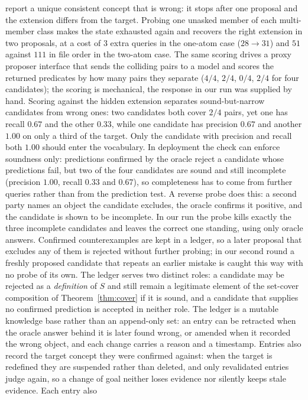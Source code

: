 \documentclass[11pt]{article}
\begin{document}
report a unique consistent concept that is wrong: it stops after one proposal and the extension
differs from the target. Probing one unasked member of each multi-member class makes the state
exhausted again and recovers the right extension in two proposals, at a cost of $3$ extra queries in
the one-atom case ($28 \to 31$) and $51$ against $111$ in file order in the two-atom case. The same scoring drives a
proxy proposer interface
that sends the colliding pairs to a model and scores the returned predicates by how many pairs they
separate ($4/4$, $2/4$, $0/4$, $2/4$ for four candidates); the scoring is mechanical, the response
in our run was supplied by hand. Scoring against the hidden extension separates sound-but-narrow
candidates from wrong ones: two candidates both cover $2/4$ pairs, yet one has recall $0.67$ and the
other $0.33$, while one candidate has precision $0.67$ and another $1.00$ on only a third of the
target. Only the candidate with precision and recall both $1.00$ should enter the vocabulary. In deployment the
check can enforce soundness only: predictions confirmed by the oracle reject a candidate whose
predictions fail, but two of the four candidates are sound and still incomplete (precision $1.00$,
recall $0.33$ and $0.67$), so completeness has to come from further queries rather than from the
prediction test. A reverse probe does this: a second party names an object the candidate excludes,
the oracle confirms it positive, and the candidate is shown to be incomplete. In our run the probe kills
exactly the three incomplete candidates and leaves the correct one standing, using only oracle
answers. Confirmed counterexamples are kept in a ledger, so a later proposal that excludes any of
them is rejected without further probing; in our second round a freshly proposed candidate that
repeats an earlier mistake is caught this way with no probe of its own. The ledger serves two
distinct roles: a candidate may be rejected as a \emph{definition} of $S$ and still remain a
legitimate element of the set-cover composition of Theorem~\ref{thm:cover} if it is sound, and a
candidate that supplies no confirmed prediction is accepted in neither role. The ledger is a
mutable knowledge base rather than an append-only set: an entry can be retracted when the oracle
answer behind it is later found wrong, or amended when it recorded the wrong object, and each
change carries a reason and a timestamp. Entries also record the target concept they were confirmed
against: when the target is redefined they are suspended rather than deleted, and only revalidated
entries judge again, so a change of goal neither loses evidence nor silently keeps stale evidence. Each entry also
\end{document}
